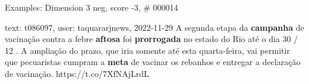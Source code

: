 \begin{frame}{Examples: Dimension 3 neg, score -3, \# 000014}
\footnotesize
\begin{alertblock}{text: t086097, user: taquararjnews, 2022-11-29}
A segunda etapa da \textbf{campanha} de vacinação contra a febre 
\textbf{aftosa} foi \textbf{prorrogada} no estado do Rio até o dia 30 / 12 . A 
ampliação do prazo, que iria somente até esta quarta-feira, vai permitir que 
pecuaristas cumpram a \textbf{meta} de vacinar os rebanhos e entregar a 
declaração de vacinação. https://t.co/7XfNAjLrdL 
\end{alertblock}
\end{frame}
